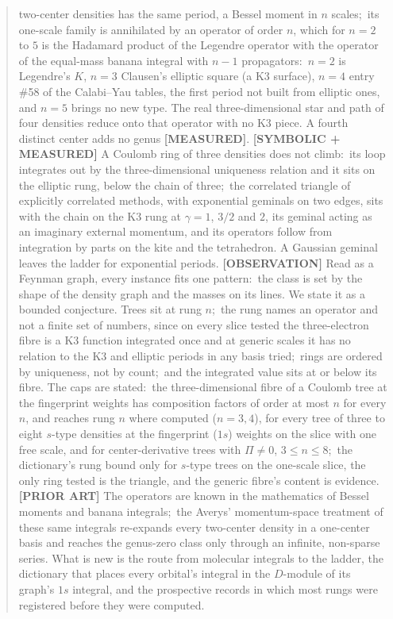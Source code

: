 \documentclass[aps,pra,twocolumn,superscriptaddress,longbibliography]{revtex4-2}
\begin{document}
\begin{abstract}
two-center densities has the same period, a Bessel moment in $n$ scales;\
its one-scale family is annihilated by an operator of order $n$, which for
$n=2$ to $5$ is the Hadamard product of the Legendre operator with the operator of the equal-mass
banana integral with $n-1$ propagators:\ $n=2$ is Legendre's $K$, $n=3$
Clausen's elliptic square (a K3 surface), $n=4$ entry \#58 of the
Calabi--Yau tables, the first period not built from elliptic ones, and $n=5$
brings no new type.  The real three-dimensional star and path of four
densities reduce onto that operator with no K3 piece.  A fourth distinct
center adds no genus \textbf{[MEASURED]}.  \textbf{[SYMBOLIC + MEASURED]} A
Coulomb ring of three densities does not climb:\ its loop integrates out by
the three-dimensional uniqueness relation and it sits on the elliptic rung,
below the chain of three;\ the correlated triangle of explicitly correlated
methods, with exponential geminals on two edges, sits with the chain on the
K3 rung at $\gamma=1$, $3/2$ and $2$, its geminal acting as an imaginary external momentum, and its
operators follow from integration by parts on the kite and the tetrahedron.
A Gaussian geminal leaves the ladder for exponential periods.
\textbf{[OBSERVATION]} Read as a Feynman graph, every instance fits one
pattern:\ the class is set by the shape of the density graph and the masses
on its lines.  We state it as a bounded conjecture.  Trees sit at rung
$n$;\ the rung names an operator and not a finite set of numbers, since on
every slice tested the three-electron fibre is a K3 function integrated
once and at generic scales it has no relation to the K3 and elliptic periods
in any basis tried;\ rings are ordered by uniqueness, not by count;\ and the
integrated value sits at or below its fibre.  The caps are stated:\ the
three-dimensional fibre of a Coulomb tree at the fingerprint weights has
composition factors of order at most $n$ for every $n$, and reaches rung $n$
where computed ($n=3,4$), for every tree of three to eight $s$-type densities at the fingerprint ($1s$) weights on the slice with one free scale, and for center-derivative trees with $\Pi\neq0$, $3\le n\le8$;\ the
dictionary's rung bound only for $s$-type trees on the one-scale slice, the
only ring tested is the triangle, and the generic fibre's content is
evidence.
\textbf{[PRIOR ART]} The operators are known in the mathematics of Bessel
moments and banana integrals;\ the Averys' momentum-space treatment of these
same integrals re-expands every two-center density in a one-center basis and
reaches the genus-zero class only through an infinite, non-sparse series.
What is new is the route from molecular integrals to the ladder, the
dictionary that places every orbital's integral in the $D$-module of its
graph's $1s$ integral, and the prospective records in which most rungs were registered before they were
computed.
\end{abstract}
\end{document}

